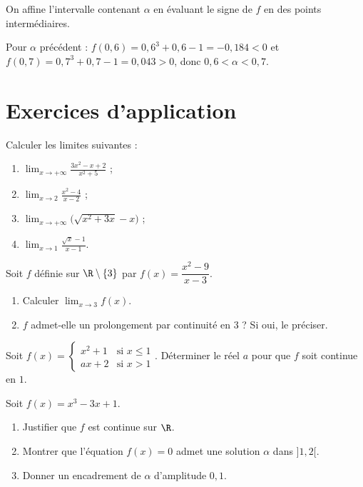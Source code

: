 On affine l'intervalle contenant $\alpha$ en évaluant le signe de $f$ en des points intermédiaires.
\begin{exemple}
Pour $\alpha$ précédent : $f(0{,}6)=0{,}6^{3}+0{,}6-1=-0{,}184<0$ et $f(0{,}7)=0{,}7^{3}+0{,}7-1=0{,}043>0$, donc $0{,}6<\alpha<0{,}7$.
\end{exemple}

\section{Exercices d'application}

Calculer les limites suivantes :
\begin{enumerate}[label=\alph*)]
\item $\displaystyle\lim_{x\to+\infty}\frac{3x^{2}-x+2}{x^{2}+5}$ ;
\item $\displaystyle\lim_{x\to2}\frac{x^{2}-4}{x-2}$ ;
\item $\displaystyle\lim_{x\to+\infty}\big(\sqrt{x^{2}+3x}-x\big)$ ;
\item $\displaystyle\lim_{x\to1}\frac{\sqrt{x}-1}{x-1}$.
\end{enumerate}

Soit $f$ définie sur $\R\setminus\{3\}$ par $f(x)=\dfrac{x^{2}-9}{x-3}$.
\begin{enumerate}[label=\alph*)]
\item Calculer $\displaystyle\lim_{x\to3}f(x)$.
\item $f$ admet-elle un prolongement par continuité en $3$ ? Si oui, le préciser.
\end{enumerate}

Soit $f(x)=\begin{cases} x^{2}+1 & \text{si } x\le1\\ ax+2 & \text{si } x>1\end{cases}$. Déterminer le réel $a$ pour que $f$ soit continue en $1$.

Soit $f(x)=x^{3}-3x+1$.
\begin{enumerate}[label=\alph*)]
\item Justifier que $f$ est continue sur $\R$.
\item Montrer que l'équation $f(x)=0$ admet une solution $\alpha$ dans $]1,2[$.
\item Donner un encadrement de $\alpha$ d'amplitude $0{,}1$.
\end{enumerate}


